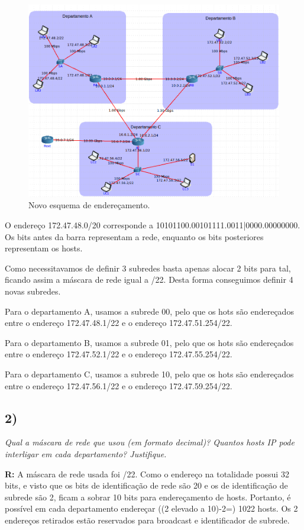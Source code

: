 \documentclass{llncs}
\begin{document}
\begin{figure}[H]
\begin{center}
\includegraphics[scale=0.40]{3_1.png} 
\end{center}
\caption{\label{fig:3_1} Novo esquema de endereçamento.}
\end{figure}

O endereço 172.47.48.0/20 corresponde a 10101100.00101111.0011|0000.00000000. Os bits
antes da barra representam a rede, enquanto os bits posteriores representam os hosts.

Como necessitavamos de definir 3 subredes basta apenas alocar 2 bits para tal, ficando
assim a máscara de rede igual a /22. Desta forma conseguimos definir 4 novas subredes.

Para o departamento A, usamos a subrede 00, pelo que os hots são endereçados entre o
endereço 172.47.48.1/22 e o endereço 172.47.51.254/22.

Para o departamento B, usamos a subrede 01, pelo que os hots são endereçados entre o
endereço 172.47.52.1/22 e o endereço 172.47.55.254/22.

Para o departamento C, usamos a subrede 10, pelo que os hots são endereçados entre o
endereço 172.47.56.1/22 e o endereço 172.47.59.254/22.

\subsection{2)}
\emph{Qual a máscara de rede que usou (em formato decimal)? Quantos hosts IP pode interligar em cada departamento? Justifique.}
\\ \par
\textbf{R:} A máscara de rede usada foi /22. Como o endereço na totalidade possui 32 bits, e visto que os bits de identificação de rede são 20 e os de identificação de subrede são 2, ficam a sobrar 10 bits para endereçamento de hosts. Portanto, é possível em cada departamento endereçar ((2 elevado a 10)-2=) 1022 hosts. Os 2 endereços retirados estão reservados para broadcast e identificador de subrede.
\end{document}
